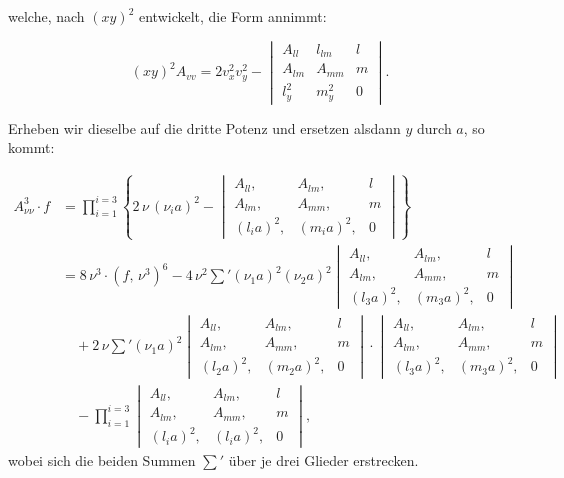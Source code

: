 \documentclass[11pt]{article}
\providecommand{\weberpage}[1]{}
\begin{document}
welche, nach $(xy)^2$ entwickelt, die Form annimmt:

\[
(xy)^2 A_{vv} = 2v_x^2v_y^2 -
\begin{vmatrix}
A_{ll} & l_{lm} & l \\
A_{lm} & A_{mm} & m \\
l_y^2 & m_y^2 & 0
\end{vmatrix}.
\]

Erheben wir dieselbe auf die dritte Potenz und ersetzen alsdann $y$ durch $a$, so kommt:


\weberpage{305}
\[
\begin{aligned}
A_{\nu\nu}^3\cdot f&=\prod_{i=1}^{i=3}\left\{2\,\nu\,(\nu_ia)^2-\begin{vmatrix}A_{ll}, & A_{lm}, & l\\ A_{lm}, & A_{mm}, & m\\ (l_ia)^2, & (m_ia)^2, & 0\end{vmatrix}\right\}\\
&=8\,\nu^3\cdot(f,\,\nu^3)^6-4\,\nu^2\sum{}'(\nu_1a)^2(\nu_2a)^2\begin{vmatrix}A_{ll}, & A_{lm}, & l\\ A_{lm}, & A_{mm}, & m\\ (l_3a)^2, & (m_3a)^2, & 0\end{vmatrix}\\
&\quad+2\,\nu\sum{}'(\nu_1a)^2\begin{vmatrix}A_{ll}, & A_{lm}, & l\\ A_{lm}, & A_{mm}, & m\\ (l_2a)^2, & (m_2a)^2, & 0\end{vmatrix}\cdot\begin{vmatrix}A_{ll}, & A_{lm}, & l\\ A_{lm}, & A_{mm}, & m\\ (l_3a)^2, & (m_3a)^2, & 0\end{vmatrix}\\
&\quad-\prod_{i=1}^{i=3}\begin{vmatrix}A_{ll}, & A_{lm}, & l\\ A_{lm}, & A_{mm}, & m\\ (l_ia)^2, & (l_ia)^2, & 0\end{vmatrix},%
\end{aligned}
\]
wobei sich die beiden Summen $\sum{}'$ über je drei Glieder erstrecken.
\end{document}
